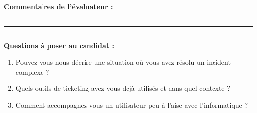 \documentclass[12pt]{article}
\begin{document}
\textbf{Commentaires de l’évaluateur :}

\vspace{2cm}
\noindent\rule{\textwidth}{0.4pt}

\vspace{1cm}
\noindent\rule{\textwidth}{0.4pt}

\vspace{1cm}
\noindent\rule{\textwidth}{0.4pt}


\textbf{Questions à poser au candidat :}
\begin{enumerate}
    \item Pouvez-vous nous décrire une situation où vous avez résolu un incident complexe ?
    \item Quels outils de ticketing avez-vous déjà utilisés et dans quel contexte ?
    \item Comment accompagnez-vous un utilisateur peu à l’aise avec l’informatique ?
\end{enumerate}
\end{document}
